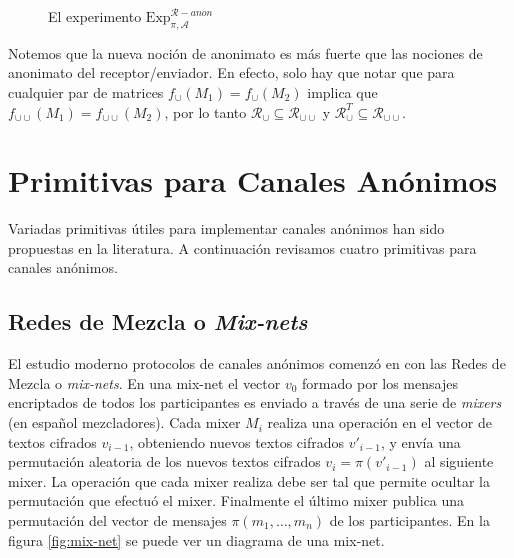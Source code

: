 \begin{figure}
\begin{centering}
\end{centering}
\caption{El experimento $\mathrm{Exp}_{\pi, \mathcal{A}}^{\mathcal{R}-anon}$}
\label{exp_anon}
\end{figure}

Notemos que la nueva noción de anonimato es más fuerte que las nociones de anonimato del receptor/enviador.
En efecto, solo hay que notar que para cualquier par de matrices $f_\cup(M_1) = f_\cup(M_2)$ implica que
$f_{\cup\cup}(M_1) = f_{\cup\cup}(M_2)$, por lo tanto $\mathcal{R}_\cup \subseteq \mathcal{R}_{\cup\cup}$
y $\mathcal{R}_\cup^T \subseteq \mathcal{R}_{\cup\cup}$.

\section{Primitivas para Canales Anónimos}

Variadas primitivas útiles para implementar canales anónimos han sido propuestas en la literatura. A continuación
revisamos cuatro primitivas para canales anónimos.

\subsection{Redes de Mezcla o \textit{Mix-nets}}
El estudio moderno protocolos de canales anónimos comenzó en \cite{journals/cacm/Chaum81} con las Redes
de Mezcla o \textit{mix-nets}. En una mix-net el vector $v_0$ formado por los mensajes encriptados de todos
los participantes es enviado a través de una serie de \textit{mixers} (en español mezcladores). Cada
mixer $M_i$ realiza una operación en el vector de textos cifrados $v_{i-1}$, obteniendo nuevos textos cifrados
$v'_{i-1}$, y envía una
permutación aleatoria de los nuevos textos cifrados $v_i = \pi(v'_{i-1})$ al siguiente mixer.
La operación que cada mixer realiza debe ser tal que permite ocultar la permutación que efectuó el mixer.
Finalmente el último mixer publica una permutación del vector de mensajes $\pi(m_1, \ldots, m_n)$ de los
participantes. En la figura \ref{fig:mix-net} se puede ver un diagrama de una mix-net.\\

